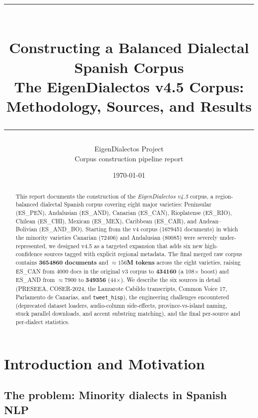 \documentclass[11pt,a4paper]{article}
\title{%
  \vspace{-1.8cm}
  \rule{\linewidth}{0.6pt}\\[0.25cm]
  {\LARGE \textbf{Constructing a Balanced Dialectal Spanish Corpus}}\\[0.12cm]
  {\large The EigenDialectos v4.5 Corpus: Methodology, Sources, and Results}\\[0.2cm]
  \rule{\linewidth}{0.6pt}%
}
\author{%
  EigenDialectos Project\\
  \small Corpus construction pipeline report
}
\date{\today}
\begin{document}
\maketitle
\thispagestyle{empty}

\begin{abstract}
\noindent
This report documents the construction of the \emph{EigenDialectos v4.5}
corpus, a region-balanced dialectal Spanish corpus covering eight major
varieties: Peninsular (ES\_PEN), Andalusian (ES\_AND), Canarian (ES\_CAN),
Rioplatense (ES\_RIO), Chilean (ES\_CHI), Mexican (ES\_MEX), Caribbean
(ES\_CAR), and Andean--Bolivian (ES\_AND\_BO). Starting from the v4 corpus
(\num{1679451} documents) in which the minority varieties Canarian
(\num{72406}) and Andalusian (\num{80085}) were severely under-represented,
we designed v4.5 as a targeted expansion that adds six new high-confidence
sources tagged with explicit regional metadata. The final merged raw corpus
contains \textbf{\num{3654860} documents} and \textbf{$\approx 156$M tokens}
across the eight varieties, raising ES\_CAN from \num{4000} docs in the
original v3 corpus to \textbf{\num{434160}} (a 108$\times$ boost) and
ES\_AND from $\approx$\num{7900} to \textbf{\num{349356}} (44$\times$). We
describe the six sources in detail (PRESEEA, COSER-2024, the Lanzarote
Cabildo transcripts, Common Voice 17, Parlamento de Canarias, and
\texttt{tweet\_hisp}), the engineering challenges encountered (deprecated
dataset loaders, audio-column side-effects, province-vs-island naming,
stuck parallel downloads, and accent substring matching), and the final
per-source and per-dialect statistics.
\end{abstract}

\tableofcontents
\newpage

\section{Introduction and Motivation}

\subsection{The problem: Minority dialects in Spanish NLP}
\end{document}
